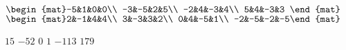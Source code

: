 \begin{Exercise}[
name={},
title={}, 
difficulty=0,
origin={\cite{GH}}]
\begin{multicols}{2}
\Question $\begin{mat}-5&1&0&0\\  -3&-5&2&5\\  -2&4&-3&4\\  5&4&-3&3 \end{mat}$
\Question $\begin{mat}2&-1&4&4\\  3&-3&3&2\\  0&4&-5&1\\  -2&-5&-2&-5\end{mat}$
\EndCurrentQuestion
\end{multicols}

\end{Exercise}
\begin{Answer}
\Question $ 15 $
\Question $ -52 $
\Question $ 0 $
\Question $ 1 $
\Question $ -113 $
\Question $ 179$
\end{Answer}
